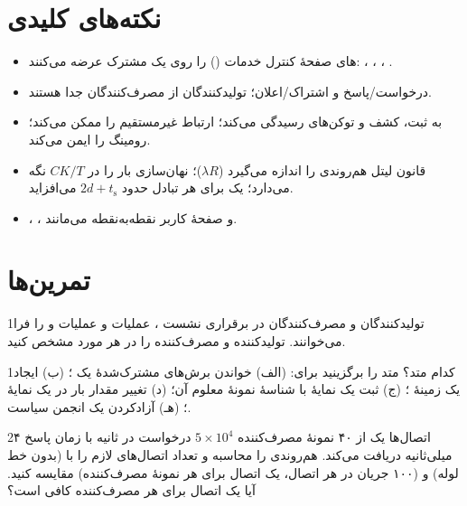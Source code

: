 \documentclass[11pt,a4paper]{article}
\begin{document}
\section{نکته‌های کلیدی}
\begin{takeawaybox}
\begin{itemize}
  \item {}های صفحهٔ کنترل  خدمات () را روی یک  مشترک عرضه می‌کنند:
        ، ، ، .
  \item درخواست/پاسخ و اشتراک/اعلان؛ تولیدکنندگان از مصرف‌کنندگان جدا هستند.
  \item {} به ثبت، کشف و توکن‌های  رسیدگی می‌کند؛  ارتباط غیرمستقیم را ممکن می‌کند؛ 
        رومینگ را ایمن می‌کند.
  \item قانون لیتل هم‌روندی را اندازه می‌گیرد ($\lambda R$)؛ نهان‌سازی بار  را در $CK/T$ نگه می‌دارد؛ یک  برای هر
        تبادل حدود $2d + t_{\mathrm{s}}$ می‌افزاید.
  \item {}، ،  و صفحهٔ کاربر نقطه‌به‌نقطه می‌مانند.
\end{itemize}
\end{takeawaybox}

\section{تمرین‌ها}

\begin{exercisebox}{1}{تولیدکنندگان و مصرف‌کنندگان}\label{exr:pc}
در برقراری نشست ،  عملیات  و  عملیات  و
 را فرا می‌خوانند. تولیدکننده و مصرف‌کننده را در هر مورد مشخص کنید.
\end{exercisebox}

\begin{exercisebox}{1}{کدام متد؟}\label{exr:method}
متد  را برگزینید برای: (الف) خواندن برش‌های مشترک‌شدهٔ یک ؛ (ب) ایجاد یک زمینهٔ ؛ (ج) ثبت یک نمایهٔ
 با شناسهٔ نمونهٔ معلوم آن؛ (د) تغییر مقدار بار در یک نمایهٔ ؛ (هـ) آزادکردن یک انجمن سیاست.
\end{exercisebox}

\begin{exercisebox}{2}{اتصال‌ها}\label{exr:conn}
یک  از ۴۰ نمونهٔ مصرف‌کننده $5\times10^4$ درخواست در ثانیه با زمان پاسخ ۴ میلی‌ثانیه دریافت می‌کند. هم‌روندی را محاسبه
و تعداد اتصال‌های لازم را با  (بدون خط لوله) و  (۱۰۰ جریان در هر اتصال، یک اتصال برای هر نمونهٔ
مصرف‌کننده) مقایسه کنید. آیا یک اتصال  برای هر مصرف‌کننده کافی است؟
\end{exercisebox}
\end{document}
